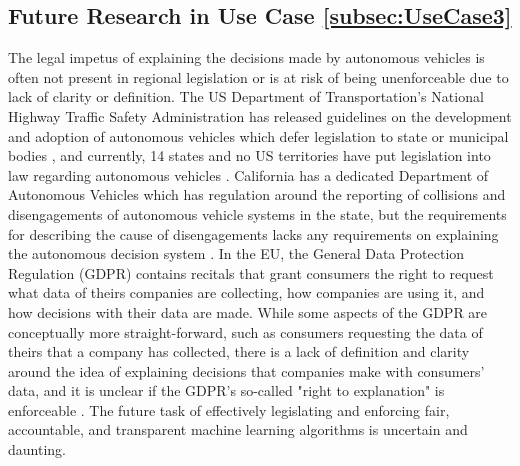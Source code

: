 \subsection{Future Research in Use Case \ref{subsec:UseCase3}}

The legal impetus of explaining the decisions made by autonomous vehicles is often not present in regional legislation or is at risk of being unenforceable due to lack of clarity or definition.  The US Department of Transportation's National Highway Traffic Safety Administration has released guidelines on the development and adoption of autonomous vehicles which defer legislation to state or municipal bodies \cite{USDOT2018}, and currently, 14 states and no US territories have put legislation into law regarding autonomous vehicles \cite{ncsl}.  California has a dedicated Department of Autonomous Vehicles which has regulation around the reporting of collisions and disengagements of autonomous vehicle systems in the state, but the requirements for describing the cause of disengagements lacks any requirements on explaining the autonomous decision system \cite{CalDMV}.  In the EU, the General Data Protection Regulation (GDPR) contains recitals that grant consumers the right to request what data of theirs companies are collecting, how companies are using it, and how decisions with their data are made.  While some aspects of the GDPR are conceptually more straight-forward, such as consumers requesting the data of theirs that a company has collected, there is a lack of definition and clarity around the idea of explaining decisions that companies make with consumers' data, and it is unclear if the GDPR's so-called "right to explanation" is enforceable \cite{Mittelstadt2017}.  The future task of effectively legislating and enforcing fair, accountable, and transparent machine learning algorithms is uncertain and daunting.

